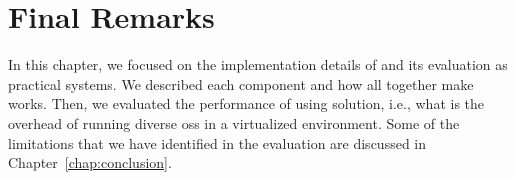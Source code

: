 \section{Final Remarks}
\label{sec:finalremarkslazarus}
In this chapter, we focused on the implementation details of \system and its evaluation as practical systems. 
We described each component and how all together make \system works. 
Then, we evaluated the performance of using \system solution, i.e., what is the overhead of running diverse \glspl{os} in a virtualized environment. 
Some of the limitations that we have identified in the evaluation are discussed in Chapter~\ref{chap:conclusion}.

